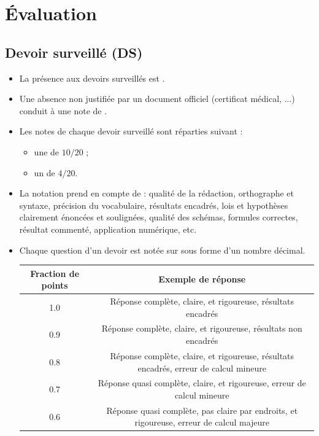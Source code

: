 \documentclass[12pt,fancy]{cours}
\begin{document}
\section{Évaluation}

\subsection{Devoir surveillé (DS)}

\begin{itemize}
      \item La présence aux devoirs surveillés est .
      \item Une absence non justifiée par un document officiel (certificat médical, ...) conduit à une note de .
      
      \item Les notes de chaque devoir surveillé sont réparties suivant :
      \begin{itemize}
            \item une  de $10/20$ ;
            \item un  de $4/20$.
      \end{itemize}
      \item La notation prend en compte de  : qualité de la rédaction, orthographe et syntaxe, précision du vocabulaire, résultats encadrés, lois et hypothèses clairement énoncées et soulignées, qualité des schémas, formules correctes, résultat commenté, application numérique, etc.
      \item Chaque question d'un devoir est notée sur  sous forme d'un nombre décimal. 
      \begin{center}
            {\small
            \begin{tabular}{|c|c|}
                  \hline
                  Fraction de points & Exemple de réponse \\
                  \hline
                  1.0 & Réponse complète, claire, et rigoureuse, résultats encadrés \\
                  0.9 & Réponse complète, claire, et rigoureuse, résultats non encadrés \\
                  0.8 & Réponse complète, claire, et rigoureuse, résultats encadrés,  erreur de calcul mineure \\
                  0.7 & Réponse quasi complète, claire, et rigoureuse, erreur de calcul mineure \\
                  0.6 & Réponse quasi complète, pas claire par endroits, et rigoureuse, erreur de calcul majeure \\

\end{tabular}}
\end{center}
\end{itemize}
\end{document}
